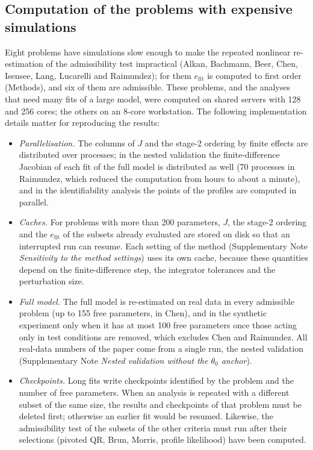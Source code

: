 \subsection*{Computation of the problems with expensive simulations}
Eight problems have simulations slow enough to make the repeated nonlinear re-estimation of the admissibility test impractical (Alkan, Bachmann, Beer, Chen, Isensee, Lang, Lucarelli and Raimundez); for them $e_{\mathrm{fit}}$ is computed to first order (Methods), and six of them are admissible. These problems, and the analyses that need many fits of a large model, were computed on shared servers with 128 and 256 cores; the others on an 8-core workstation. The following implementation details matter for reproducing the results:
\begin{itemize}\itemsep0pt
\item \emph{Parallelisation.} The columns of $J$ and the stage-2 ordering by finite effects are distributed over processes; in the nested validation the finite-difference Jacobian of each fit of the full model is distributed as well (70 processes in Raimundez, which reduced the computation from hours to about a minute), and in the identifiability analysis the points of the profiles are computed in parallel.
\item \emph{Caches.} For problems with more than 200 parameters, $J$, the stage-2 ordering and the $e_{\mathrm{fit}}$ of the subsets already evaluated are stored on disk so that an interrupted run can resume. Each setting of the method (Supplementary Note \emph{Sensitivity to the method settings}) uses its own cache, because these quantities depend on the finite-difference step, the integrator tolerances and the perturbation size.
\item \emph{Full model.} The full model is re-estimated on real data in every admissible problem (up to 155 free parameters, in Chen), and in the synthetic experiment only when it has at most 100 free parameters once those acting only in test conditions are removed, which excludes Chen and Raimundez. All real-data numbers of the paper come from a single run, the nested validation (Supplementary Note \emph{Nested validation without the $\theta_0$ anchor}).
\item \emph{Checkpoints.} Long fits write checkpoints identified by the problem and the number of free parameters. When an analysis is repeated with a different subset of the same size, the results and checkpoints of that problem must be deleted first; otherwise an earlier fit would be resumed. Likewise, the admissibility test of the subsets of the other criteria must run after their selections (pivoted QR, Brun, Morris, profile likelihood) have been computed.
\end{itemize}

